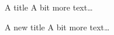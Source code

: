 \documentclass[UKenglish]{beamer}
\begin{document}
\begin{frame}{A title}
    A bit more text\ldots
\end{frame}

\begin{frame}{A new title}
    A bit more text\ldots
\end{frame}
\end{document}
